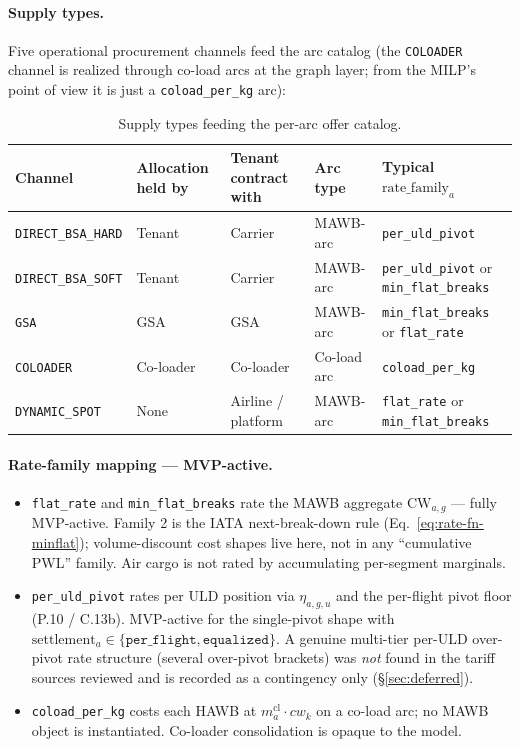 \documentclass[11pt,a4paper]{article}
\theoremstyle{definition}
\begin{document}
\paragraph{Supply types.}
Five operational procurement channels feed the arc catalog (the
\texttt{COLOADER} channel is realized through co-load arcs at the graph
layer; from the MILP's point of view it is just a \texttt{coload\_per\_kg}
arc):
\begin{table}[H]
\centering
\caption{Supply types feeding the per-arc offer catalog.}
\label{tab:supply-types}
\begin{tabular}{p{2.5cm}p{2.0cm}p{2.0cm}p{2.5cm}p{4.5cm}}
\toprule
Channel & Allocation held by & Tenant contract with & Arc type & Typical $\text{rate\_family}_a$ \\
\midrule
\texttt{DIRECT\_BSA\_HARD} & Tenant & Carrier & MAWB-arc & \texttt{per\_uld\_pivot} \\
\texttt{DIRECT\_BSA\_SOFT} & Tenant & Carrier & MAWB-arc & \texttt{per\_uld\_pivot} or \texttt{min\_flat\_breaks} \\
\texttt{GSA} & GSA & GSA & MAWB-arc & \texttt{min\_flat\_breaks} or \texttt{flat\_rate} \\
\texttt{COLOADER} & Co-loader & Co-loader & Co-load arc & \texttt{coload\_per\_kg} \\
\texttt{DYNAMIC\_SPOT} & None & Airline / platform & MAWB-arc & \texttt{flat\_rate} or \texttt{min\_flat\_breaks} \\
\bottomrule
\end{tabular}
\end{table}

\paragraph{Rate-family mapping --- MVP-active.}
\begin{itemize}[noitemsep]
  \item \texttt{flat\_rate} and \texttt{min\_flat\_breaks} rate the MAWB
        aggregate $\text{CW}_{a,g}$ --- fully MVP-active. Family 2 is the IATA
        next-break-down rule (Eq.~\ref{eq:rate-fn-minflat}); volume-discount
        cost shapes live here, not in any ``cumulative PWL'' family. Air cargo
        is not rated by accumulating per-segment marginals.
  \item \texttt{per\_uld\_pivot} rates per ULD position via $\eta_{a,g,u}$ and
        the per-flight pivot floor (P.10 / C.13b). MVP-active for the
        single-pivot shape with $\text{settlement}_a \in \{\texttt{per\_flight},
        \texttt{equalized}\}$. A genuine multi-tier per-ULD over-pivot rate
        structure (several over-pivot brackets) was \emph{not} found in the
        tariff sources reviewed and is recorded as a contingency only
        (\S\ref{sec:deferred}).
  \item \texttt{coload\_per\_kg} costs each HAWB at $m_a^{\text{cl}} \cdot
        cw_k$ on a co-load arc; no MAWB object is instantiated. Co-loader
        consolidation is opaque to the model.
\end{itemize}
\end{document}
